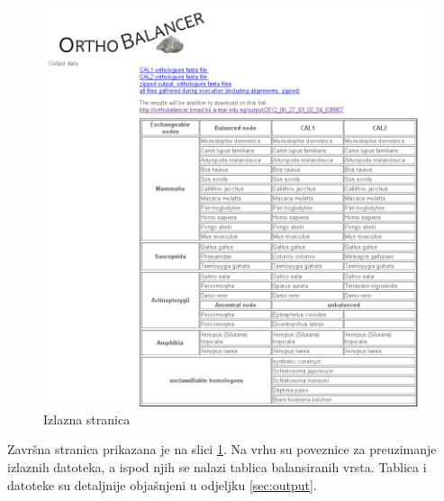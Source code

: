 \begin{figure}[h!]
\centering
\includegraphics[width=5.8in]{figures/output-html.png}
\caption{Izlazna stranica}
\label{fig:output-html}
\end{figure} 
 
Završna stranica prikazana je na slici \ref{fig:output-html}. Na vrhu su
poveznice za preuzimanje izlaznih datoteka, a ispod njih se nalazi tablica
balansiranih vrsta. Tablica i datoteke su detaljnije objašnjeni u odjeljku
\ref{sec:output}.
